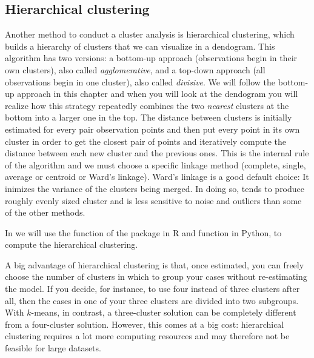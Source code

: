 \subsection{Hierarchical clustering}

Another method to conduct a cluster analysis is hierarchical clustering, which builds a hierarchy of clusters that we can visualize in a dendogram.  This algorithm has two versions: a bottom-up approach (observations begin in their own clusters), also called \textit{agglomerative}, and a top-down approach (all observations begin in one cluster), also called \textit{divisive}. We will follow the bottom-up approach in this chapter and when you will look at the dendogram you will realize how this strategy repeatedly combines the two \textit{nearest} clusters at the bottom into a larger one in the top. The distance between clusters is initially estimated for every pair observation points and then put every point in its own cluster in order to get the closest pair of points and iteratively compute the distance between each new cluster and the previous ones. This is the internal rule of the algorithm and we must choose a specific linkage method (complete, single, average or centroid or Ward's linkage). Ward's linkage is a good default choice: It inimizes the variance of the clusters being merged. In doing so, tends to produce roughly evenly sized cluster and is less sensitive to noise and outliers than some of the other methods. 

In  we will use the function  of the package  in R and  function  in Python, to compute the hierarchical clustering. 

A big advantage of hierarchical clustering is that, once estimated,
you can freely choose the number of clusters in which to group your
cases without re-estimating the model. If you decide, for instance, to
use four instead of three clusters after all, then the cases in one of
your three clusters are divided into two subgroups. With $k$-means, in
contrast, a three-cluster solution can be completely different from a
four-cluster solution. However, this comes at a big cost: hierarchical
clustering requires a lot more computing resources and may therefore
not be feasible for large datasets.


